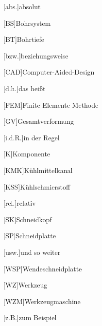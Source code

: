 

\begin{acronym}[SEPSEP]

[abs.]{absolut}


[BS]{Bohrsystem}

[BT]{Bohrtiefe}

[bzw.]{beziehungsweise}

[CAD]{Computer-Aided-Design}

[d.h.]{das heißt}

[FEM]{Finite-Elemente-Methode}

[GV]{Gesamtverformung}

[i.d.R.]{in der Regel}

[K]{Komponente}

[KMK]{Kühlmittelkanal}

[KSS]{Kühlschmierstoff}

[rel.]{relativ}

[SK]{Schneidkopf}

[SP]{Schneidplatte}

[usw.]{und so weiter}

[WSP]{Wendeschneidplatte}

[WZ]{Werkzeug}

[WZM]{Werkzeugmaschine}

[z.B.]{zum Beispiel}


\end{acronym}
